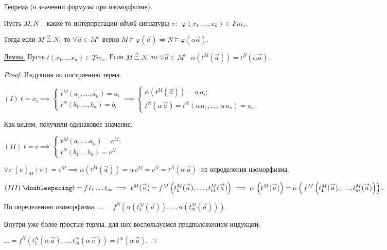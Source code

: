 \documentclass[a4paper, fleqn]{article}
\begin{document}
    \underline{Теорема} (о значении формулы при изоморфизме). 
    
    Пусть $M, N$ -- какие-то интерпретации \textit{одной} сигнатуры $\sigma; \; \; \varphi(x_1, \dots, x_n) \in Fm_\sigma.$
    
    Тогда если $M \overset{\alpha}{\cong} N,$ то $\forall \overset{\to}{a} \in M^n $ верно  $M \vDash \varphi (\overset{\to}{a}) \iff N \vDash \varphi (\alpha \overset{\to}{a}).$
    
    \underline{Лемма.} Пусть $t(x_1, \dots x_n) \in Tm_\sigma.$ Если $M \overset{\alpha}{\cong} N$, то $\forall \overset{\to}{a} \in M^n \; \; \alpha (t^M (\overset{\to}{a})) = t^N (\alpha \overset{\to}{a}).$
    
    \begin{proof} Индукция по построению терма.
    
    \onehalfspacing $(I) \;  t = x_i \implies \begin{cases} t^M (a_1, \dots,  a_n) = a_i \\ t^N (b_1, \dots,  b_n) = b_i  \end{cases} \implies
    \begin{cases}
    \alpha (t^M (\overset{\to}{a})) = \alpha  \, a_i; \\
    t^N (\alpha \, \overset{\to}{a}) = t^N(\alpha \, a_1, \dots, \, \alpha \, a_n) = a_i.
    \end{cases}$
    
    Как видим, получили одинаковое значение.
    
    $(II) \; t = c \implies
    \begin{cases}
    t^M (a_1, \dots a_n) = c^M;\\
    t^N (b_1, \dots b _n) = c^N.
    \end{cases} $
    
    $ \forall \pi \; [\, c \, ]_M (\pi) = c^M  \implies
    \alpha (t^M(\overset{\to}{a})) = \alpha \, c^M = c^N = t^N (\alpha \, \overset{\to}{a})\;$ из определения изоморфизма.
    
    $(III) \;\doublespacing  t = f \, t_1 \dots  t_m \implies
    t^M(\overset{\to}{a}) = f^M \left(t_1^M(\overset{\to}{a})   , \dots, t_m^M(\overset{\to}{a}) \right) \implies
    \alpha \,\left( t^M(\overset{\to}{a})\right) = \alpha \left(\, f^M \left(t_1^M(\overset{\to}{a})   , \dots, t_m^M(\overset{\to}{a}) \right) \right).
     $ 
    
    По определению изоморфизма,  $\dots =  f^N \left( \alpha \left(t_1^M(\overset{\to}{a})\right)   , \dots,  \alpha \left(t_m^M(\overset{\to}{a}) \right) \right).$ 
    
    Внутри уже более простые термы, для них воспользуемся предположением индукции:
    
    $\dots =   f^N \left(  t_1^N(\alpha \, \overset{\to}{a})   , \dots, t_m^N( \alpha \, \overset{\to}{a})  \right) = t^N(\alpha \, \overset{\to}{a}).$
    
    \end{proof}
        
\end{document}
